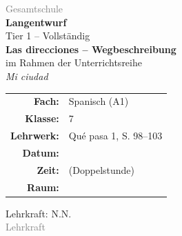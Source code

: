 \documentclass[11pt,a4paper]{article}
\newcommand{\fach}{Spanisch}
\newcommand{\jahrgangsstufe}{7}
\newcommand{\schulart}{Gesamtschule}
\newcommand{\stundenthema}{Las direcciones -- Wegbeschreibung}
\newcommand{\reihenthema}{Mi ciudad}
\newcommand{\lehrkraft}{N.N.}
\newcommand{\ausbildungsstand}{Lehrkraft}
\newcommand{\gerniveau}{A1}
\newcommand{\lehrwerk}{Qué pasa 1}
\newcommand{\lehrwerkseite}{S. 98--103}
\begin{document}
\begin{titlepage}
    \centering
    \vspace*{2cm}

    {\large\textcolor{gray}{\schulart}}\\[2cm]

    {\Huge\textcolor{fach}{\textbf{Langentwurf}}}\\[0.5cm]
    {\large Tier 1 -- Vollständig}\\[2cm]

    {\LARGE\textbf{\stundenthema}}\\[0.5cm]
    {\large im Rahmen der Unterrichtsreihe}\\[0.3cm]
    {\Large\textit{\reihenthema}}\\[2cm]

    \begin{tabular}{rl}
        \textbf{Fach:} & \fach{} (\gerniveau) \\[0.3cm]
        \textbf{Klasse:} & \jahrgangsstufe \\[0.3cm]
        \textbf{Lehrwerk:} & \lehrwerk, \lehrwerkseite \\[0.3cm]
        \textbf{Datum:} & \underline{\hspace{3cm}} \\[0.3cm]
        \textbf{Zeit:} & \underline{\hspace{3cm}} (Doppelstunde) \\[0.3cm]
        \textbf{Raum:} & \underline{\hspace{3cm}} \\[0.3cm]
    \end{tabular}

    \vfill

    {\large Lehrkraft: \lehrkraft}\\[0.3cm]
    {\normalsize\textcolor{gray}{\ausbildungsstand}}\\[1cm]

\end{titlepage}

\tableofcontents
\newpage

\end{document}
